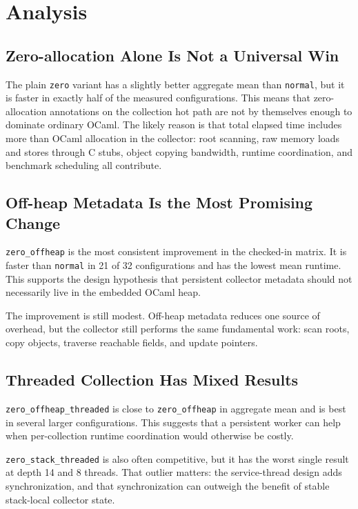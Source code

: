 \documentclass[11pt]{article}
\begin{document}
\section{Analysis}

\subsection{Zero-allocation Alone Is Not a Universal Win}

The plain \texttt{zero} variant has a slightly better aggregate mean than
\texttt{normal}, but it is faster in exactly half of the measured configurations.
This means that zero-allocation annotations on the collection hot path are not
by themselves enough to dominate ordinary OCaml. The likely reason is that total
elapsed time includes more than OCaml allocation in the collector: root scanning,
raw memory loads and stores through C stubs, object copying bandwidth, runtime
coordination, and benchmark scheduling all contribute.

\subsection{Off-heap Metadata Is the Most Promising Change}

\texttt{zero\_offheap} is the most consistent improvement in the checked-in
matrix. It is faster than \texttt{normal} in 21 of 32 configurations and has the
lowest mean runtime. This supports the design hypothesis that persistent
collector metadata should not necessarily live in the embedded OCaml heap.

The improvement is still modest. Off-heap metadata reduces one source of
overhead, but the collector still performs the same fundamental work: scan
roots, copy objects, traverse reachable fields, and update pointers.

\subsection{Threaded Collection Has Mixed Results}

\texttt{zero\_offheap\_threaded} is close to \texttt{zero\_offheap} in aggregate
mean and is best in several larger configurations. This suggests that a
persistent worker can help when per-collection runtime coordination would
otherwise be costly.

\texttt{zero\_stack\_threaded} is also often competitive, but it has the worst
single result at depth 14 and 8 threads. That outlier matters: the service-thread
design adds synchronization, and that synchronization can outweigh the benefit
of stable stack-local collector state.
\end{document}
